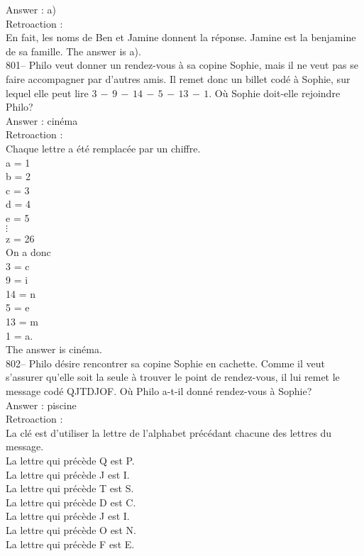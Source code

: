 ﻿\documentclass[letterpaper, 12pt]{article}
\begin{document}
Answer : a)\\

Retroaction : \\
En fait, les noms de Ben et Jamine donnent la r\'eponse.  Jamine est la
benjamine de sa famille.  The answer is a).\\

801-- Philo veut donner un rendez-vous \`a sa copine Sophie, mais il ne veut
pas se faire accompagner par d'autres amis.  Il remet donc un billet cod\'e
\`a Sophie,  sur lequel elle peut lire $3\,-\,9\,-\,14\,-\,5\,-\,13\,-\,1$.
O\`u Sophie doit-elle rejoindre Philo?\\

Answer : cin\'ema\\

Retroaction : \\
Chaque lettre a \'et\'e remplac\'ee par un chiffre. \\
a = 1\\
b = 2\\
c = 3\\
d = 4\\
e = 5\\
$\vdots$\\
z = 26\\

On a donc\\
3 = c\\
9 = i\\
14 = n\\
5 = e\\
13 = m\\
1 = a.\\

The answer is cin\'ema.\\

802-- Philo d\'esire rencontrer sa copine Sophie en cachette.  Comme il veut
s'assurer qu'elle soit la seule \`a trouver le point de rendez-vous, il lui
remet le message cod\'e QJTDJOF.  O\`u Philo a-t-il donn\'e rendez-vous \`a
Sophie?\\

Answer : piscine\\

Retroaction : \\
La cl\'e est d'utiliser la lettre de l'alphabet pr\'ec\'edant chacune des
lettres du message.\\
La lettre qui pr\'ec\`ede Q est P.\\
La lettre qui pr\'ec\`ede J est I.\\
La lettre qui pr\'ec\`ede T est S.\\
La lettre qui pr\'ec\`ede D est C.\\
La lettre qui pr\'ec\`ede J est I.\\
La lettre qui pr\'ec\`ede O est N.\\
La lettre qui pr\'ec\`ede F est E.\\
\end{document}
